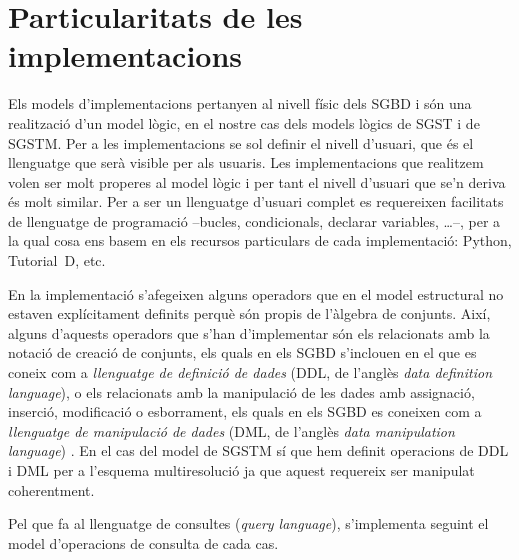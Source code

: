 






\section{Particularitats de les implementacions}



Els models d'implementacions pertanyen al nivell físic dels \gls{SGBD}
i són una realització d'un model lògic, en el nostre cas dels models
lògics de \gls{SGST} i de \gls{SGSTM}. Per a les implementacions se
sol definir el nivell d'usuari, que és el llenguatge que serà visible
per als usuaris. Les implementacions que realitzem volen ser molt
properes al model lògic i per tant el nivell d'usuari que se'n deriva
és molt similar. Per a ser un llenguatge d'usuari complet es
requereixen facilitats de llenguatge de programació --bucles,
condicionals, declarar variables, \dots--, per a la qual cosa ens
basem en els recursos particulars de cada implementació: Python,
Tutorial~D, etc.




En la implementació s'afegeixen alguns operadors que en el model
estructural no estaven explícitament definits perquè són propis de
l'àlgebra de conjunts. Així, alguns d'aquests operadors que s'han
d'implementar són els relacionats amb la notació de creació de
conjunts, %
els quals en els \gls{SGBD} s'inclouen en el que es coneix com a
\emph{llenguatge de definició de dades} (DDL, de l'anglès \emph{data
  definition language}), o els relacionats amb la manipulació de les
dades amb assignació, inserció, modificació o esborrament, els quals
en els SGBD es coneixen com a \emph{llenguatge de manipulació de
  dades} (DML, de l'anglès \emph{data manipulation language}) .  En el
cas del model de \gls{SGSTM} sí que hem definit operacions de DDL i DML per
a l'esquema multiresolució ja que aquest requereix ser manipulat
coherentment.

Pel que fa al llenguatge de consultes (\emph{query language}),
s'implementa seguint el model d'operacions de consulta de cada cas.












